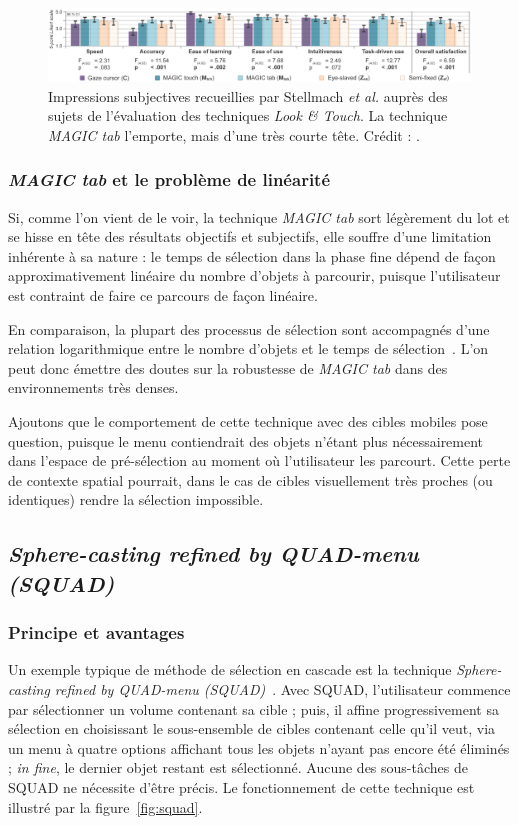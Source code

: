 	\begin{figure}[!htb]
		\centering
		\includegraphics[width=\textwidth]{figures/ch2/latSubj}
		\caption[\emph{Look \&{} Touch -- impressions subjectives}]{Impressions subjectives recueillies par Stellmach \emph{et al.} auprès des sujets de l'évaluation des techniques \emph{Look \&{} Touch}. La technique \emph{MAGIC tab} l'emporte, mais d'une très courte tête. Crédit : \cite{stellmach2012look}.}
		\label{fig:latSubj}
	\end{figure}
	
	\subsubsection{\emph{MAGIC tab} et le problème de linéarité}
	Si, comme l'on vient de le voir, la technique \emph{MAGIC tab} sort légèrement du lot et se hisse en tête des résultats objectifs et subjectifs, elle souffre d'une limitation inhérente à sa nature : le temps de sélection dans la phase fine dépend de façon approximativement linéaire du nombre d'objets à parcourir, puisque l'utilisateur est contraint de faire ce parcours de façon linéaire.
	
	En comparaison, la plupart des processus de sélection sont accompagnés d'une relation logarithmique entre le nombre d'objets et le temps de sélection~\cite{hick1952rate, hyman1953stimulus}. L'on peut donc émettre des doutes sur la robustesse de \emph{MAGIC tab} dans des environnements très denses.
	
	Ajoutons que le comportement de cette technique avec des cibles mobiles pose question, puisque le menu contiendrait des objets n'étant plus nécessairement dans l'espace de pré-sélection au moment où l'utilisateur les parcourt. Cette perte de contexte spatial pourrait, dans le cas de cibles visuellement très proches (ou identiques) rendre la sélection impossible.
	
	\subsection{\emph{Sphere-casting refined by QUAD-menu
(SQUAD)}}
	\subsubsection{Principe et avantages}
	Un exemple typique de méthode de sélection en cascade est la technique \emph{Sphere-casting refined by QUAD-menu
(SQUAD)}~\cite{kopper2011rapid}. Avec SQUAD, l'utilisateur commence par sélectionner un volume contenant sa cible ; puis, il affine progressivement sa sélection en choisissant le sous-ensemble de cibles contenant celle qu'il veut, via un menu à quatre options affichant tous les objets n'ayant pas encore été éliminés ; \emph{in fine}, le dernier objet restant est sélectionné. Aucune des sous-tâches de SQUAD ne nécessite d'être précis. Le fonctionnement de cette technique est illustré par la figure~\ref{fig:squad}.

